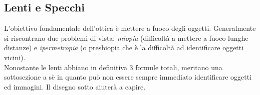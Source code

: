 \subsection{Lenti e Specchi}\label{subsec:onde:lenti}
L'obiettivo fondamentale dell'ottica è mettere a fuoco degli oggetti. Generalmente si riscontrano
due problemi di vista: \emph{miopia} (difficoltà a mettere a fuoco lunghe distanze) e 
\emph{ipermetropia} (o presbiopia che è la difficoltà ad identificare oggetti vicini).\\
[\baselineskip]
Nonostante le lenti abbiano in definitiva 3 formule totali, meritano una sottosezione a sè in 
quanto può non essere sempre immediato identificare oggetti ed immagini. Il disegno sotto aiuterà
a capire.

\begin{center}
\end{center}

